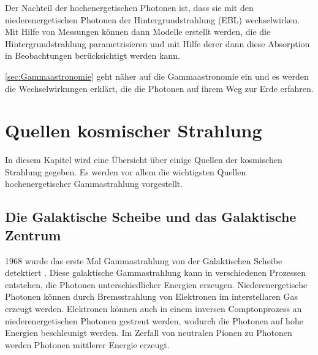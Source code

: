Der Nachteil der hochenergetischen Photonen ist, dass sie mit den niederenergetischen Photonen der Hintergrundstrahlung (EBL) wechselwirken.
Mit Hilfe von Messungen können dann Modelle erstellt werden, die die Hintergrundstrahlung parametrisieren und mit Hilfe derer dann diese Absorption in Beobachtungen berücksichtigt werden kann.


\autoref{sec:Gammaastronomie} geht näher auf die Gammaastronomie ein und es werden die Wechselwirkungen erklärt, die die Photonen auf ihrem Weg zur Erde erfahren.


\section{Quellen kosmischer Strahlung}
\label{sec:Quellen}
In diesem Kapitel wird eine Übersicht über einige Quellen der kosmischen Strahlung gegeben.
Es werden vor allem die wichtigsten Quellen hochenergetischer Gammastrahlung vorgestellt.

\subsection{Die Galaktische Scheibe und das Galaktische Zentrum}
1968 wurde das erste Mal Gammastrahlung von der Galaktischen Scheibe detektiert \cite{GalacticPlane}.
Diese galaktische Gammastrahlung kann in verschiedenen Prozessen entstehen, die Photonen unterschiedlicher Energien erzeugen.
Niederenergetische Photonen können durch Bremsstrahlung von Elektronen im interstellaren Gas erzeugt werden.
Elektronen können auch in einem inversen Comptonprozess an niederenergetischen Photonen gestreut werden, wodurch die Photonen auf hohe Energien beschleunigt werden.
Im Zerfall von neutralen Pionen zu Photonen werden Photonen mittlerer Energie erzeugt.





